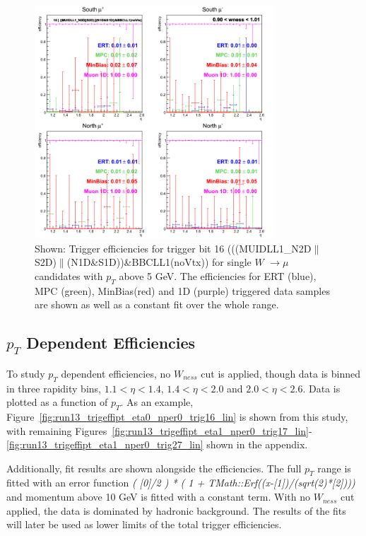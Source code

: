 \begin{figure}[ht]
  \centering
  \includegraphics[width=0.8\textwidth]{./figures/run13_trigeffieta_w1_trig16_lin.png}
  \caption{
    Shown: Trigger efficiencies for trigger bit 16
    (((MUIDLL1\_N2D$\|$S2D)$\|$(N1D\&S1D))\&BBCLL1(noVtx)) for single $W$
    $\rightarrow \mu$ candidates with $p_T$ above 5 GeV. The
    efficiencies for ERT (blue), MPC (green), MinBias(red) and 1D (purple)
    triggered data samples are shown as well as a constant fit over the whole
    range.
  }
  \label{fig:run13_trigeffieta_w0_nper0_trig16_lin} 
\end{figure}

\clearpage
\subsection{$p_T$ Dependent Efficiencies}
To study $p_T$ dependent efficiencies, no $W_{ness}$ cut is
applied, though data is binned in three rapidity bins, $1.1 < \eta < 1.4$, $1.4
< \eta < 2.0$ and $2.0 < \eta < 2.6 $. Data is plotted as a function of $p_T$.
As an example, Figure~\ref{fig:run13_trigeffipt_eta0_nper0_trig16_lin} is shown
from this study, with remaining
Figures~\ref{fig:run13_trigeffipt_eta1_nper0_trig17_lin}-\ref{fig:run13_trigeffipt_eta1_nper0_trig27_lin}
shown in the appendix.

Additionally, fit results are shown alongside the efficiencies. The full
$p_T$ range is fitted with an error function {\it ( [0]/2 ) * ( 1
+ TMath::Erf((x-[1])/(sqrt(2)*[2])))} and momentum above 10 GeV is fitted with a
constant term. With no $W_{ness}$ cut applied, the data is dominated by hadronic
background. The results of the fits will later be used as lower limits of the
total trigger efficiencies. 

